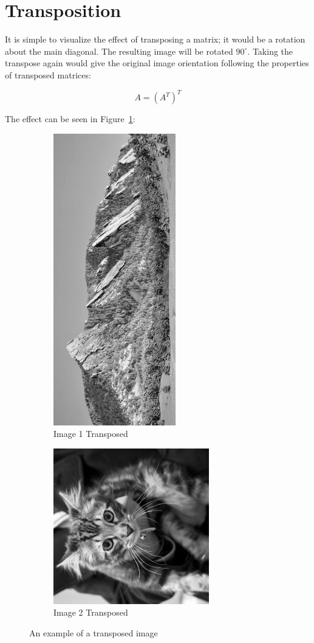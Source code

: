 \section{Transposition}

It is simple to visualize the effect of transposing a matrix; it would be a rotation about the main diagonal. The resulting image will be rotated $90^\circ$. Taking the transpose again would give the original image orientation following the properties of transposed matrices:

    \[
    A=(A^T)^T
    \]

The effect can be seen in Figure~\ref{fig:tr}:

    \begin{figure}[h!]
        \centering
            \begin{subfigure}{0.3\textwidth}
                \includegraphics[scale=0.5]{./img/transpose1.png}
                \caption{Image 1 Transposed}
            \end{subfigure}
            \begin{subfigure}{0.3\textwidth}
                \includegraphics[scale=0.5]{./img/transpose2.png}
                \caption{Image 2 Transposed}
            \end{subfigure}
        \caption{An example of a transposed image}
        \label{fig:tr}
    \end{figure}
